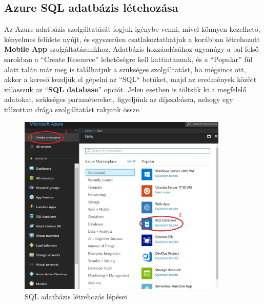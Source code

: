 \documentclass[a4paper,12pt]{report}
\begin{document}
\subsection{Azure SQL adatbázis létehozása}
    Az Azure adatbázis szolgáltatását fogjuk igénybe venni, mivel könnyen kezelhető, kényelmes felülete nyújt, és egyszerűen
    csatlakoztathatjuk a korábban létrehozott \textbf{Mobile App} szolgáltatásunkhoz.
    Adatbázis hozzáadásához ugyanúgy a bal felső sarokban a ``Create Resource'' lehetőségre kell kattintanunk, és a ``Popular''
    fül alatt talán már meg is találhatjuk a szükséges szolgáltatást, ha mégsincs ott, akkor a kereső kezdjük el gépelni az ``SQL``
    betűket, majd az eredmények között válasszuk az ``\textbf{SQL database}'' opciót.
    Jelen esetben is töltsük ki a megfelelő adatokat, szükséges paramétereket, figyeljünk az díjszabásra, nehogy egy túlzottan drága
    szolgáltatást rakjunk össze.

\begin{figure}[H]
    \centering
    \includegraphics[width=10cm,keepaspectratio]{images/azuresqldatabase.jpg}
    \caption{SQL adatbázis létrehozás lépései}
    \label{fig: SQLDatabase}
\end{figure}


\end{document}
